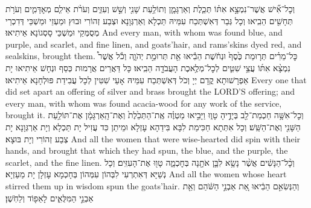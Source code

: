 {%
{וְכׇל־אִ֞ישׁ אֲשֶׁר־נִמְצָ֣א אִתּ֗וֹ תְּכֵ֧לֶת וְאַרְגָּמָ֛ן וְתוֹלַ֥עַת שָׁנִ֖י וְשֵׁ֣שׁ וְעִזִּ֑ים וְעֹרֹ֨ת אֵילִ֧ם מְאׇדָּמִ֛ים וְעֹרֹ֥ת תְּחָשִׁ֖ים הֵבִֽיאוּ׃
}
{וְכָל גְּבַר דְּאִשְׁתְּכַח עִמֵּיהּ תַּכְלָא וְאַרְגְּוָנָא וּצְבַע זְהוֹרִי וּבוּץ וּמַעְזֵי וּמַשְׁכֵּי דְּדִכְרֵי מְסֻמְּקֵי וּמַשְׁכֵּי סָסְגוֹנָא אֵיתִיאוּ׃}
{And every man, with whom was found blue, and purple, and scarlet, and fine linen, and goats’hair, and rams’skins dyed red, and sealskins, brought them.}{}
{כׇּל־מֵרִ֗ים תְּר֤וּמַת כֶּ֙סֶף֙ וּנְחֹ֔שֶׁת הֵבִ֕יאוּ אֵ֖ת תְּרוּמַ֣ת יְהֹוָ֑ה וְכֹ֡ל אֲשֶׁר֩ נִמְצָ֨א אִתּ֜וֹ עֲצֵ֥י שִׁטִּ֛ים לְכׇל־מְלֶ֥אכֶת הָעֲבֹדָ֖ה הֵבִֽיאוּ׃}
{כָּל דַּאֲרֵים אֲרָמוּת כְּסַף וּנְחָשׁ אֵיתִיאוּ יָת אַפְרָשׁוּתָא קֳדָם יְיָ וְכֹל דְּאִשְׁתְּכַח עִמֵּיהּ אָעֵי שִׁטִּין לְכָל עֲבִידַת פּוּלְחָנָא אֵיתִיאוּ׃}
{Every one that did set apart an offering of silver and brass brought the LORD’S offering; and every man, with whom was found acacia-wood for any work of the service, brought it.}{}
{וְכׇל־אִשָּׁ֥ה חַכְמַת־לֵ֖ב בְּיָדֶ֣יהָ טָו֑וּ וַיָּבִ֣יאוּ מַטְוֶ֗ה אֶֽת־הַתְּכֵ֙לֶת֙ וְאֶת־הָֽאַרְגָּמָ֔ן אֶת־תּוֹלַ֥עַת הַשָּׁנִ֖י וְאֶת־הַשֵּֽׁשׁ׃}
{וְכָל אִתְּתָא חַכִּימַת לִבָּא בִּידַהָא עָזְלָא וּמֵיתַן כִּד עֲזִיל יָת תַּכְלָא וְיָת אַרְגְּוָנָא יָת צְבַע זְהוֹרִי וְיָת בּוּצָא׃}
{And all the women that were wise-hearted did spin with their hands, and brought that which they had spun, the blue, and the purple, the scarlet, and the fine linen.}{}
{וְכׇ֨ל־הַנָּשִׁ֔ים אֲשֶׁ֨ר נָשָׂ֥א לִבָּ֛ן אֹתָ֖נָה בְּחׇכְמָ֑ה טָו֖וּ אֶת־הָעִזִּֽים׃
}
{וְכָל נְשַׁיָּא דְּאִתְרְעִי לִבְּהוֹן עִמְּהוֹן בְּחָכְמָא עָזְלָן יָת מַעַזְיָא׃}
{And all the women whose heart stirred them up in wisdom spun the goats’hair.}{}
{וְהַנְּשִׂאִ֣ם הֵבִ֔יאוּ אֵ֚ת אַבְנֵ֣י הַשֹּׁ֔הַם וְאֵ֖ת אַבְנֵ֣י הַמִּלֻּאִ֑ים לָאֵפ֖וֹד וְלַחֹֽשֶׁן׃
}}
